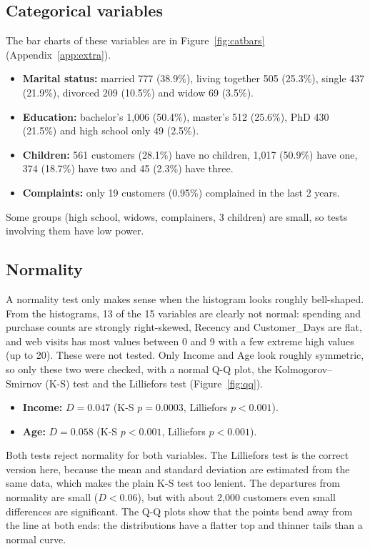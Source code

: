 \documentclass[11pt,a4paper]{article}
\begin{document}
\subsection{Categorical variables}
The bar charts of these variables are in Figure~\ref{fig:catbars} (Appendix~\ref{app:extra}).
\begin{itemize}
	\item \textbf{Marital status:} married 777 (38.9\%), living together 505 (25.3\%), single 437 (21.9\%), divorced 209 (10.5\%) and widow 69 (3.5\%).
	\item \textbf{Education:} bachelor's 1,006 (50.4\%), master's 512 (25.6\%), PhD 430 (21.5\%) and high school only 49 (2.5\%).
	\item \textbf{Children:} 561 customers (28.1\%) have no children, 1,017 (50.9\%) have one, 374 (18.7\%) have two and 45 (2.3\%) have three.
	\item \textbf{Complaints:} only 19 customers (0.95\%) complained in the last 2 years.
\end{itemize}
Some groups (high school, widows, complainers, 3 children) are small, so tests involving them have low power.

\subsection{Normality}
\label{sec:normality}
A normality test only makes sense when the histogram looks roughly bell-shaped. From the histograms, 13 of the 15 variables are clearly not normal: spending and purchase counts are strongly right-skewed, Recency and Customer\_Days are flat, and web visits has most values between 0 and 9 with a few extreme high values (up to 20). These were not tested. Only Income and Age look roughly symmetric, so only these two were checked, with a normal Q-Q plot, the Kolmogorov--Smirnov (K-S) test and the Lilliefors test (Figure~\ref{fig:qq}).

\begin{itemize}
	\item \textbf{Income:} $D = 0.047$ (K-S $p = 0.0003$, Lilliefors $p < 0.001$).
	\item \textbf{Age:} $D = 0.058$ (K-S $p < 0.001$, Lilliefors $p < 0.001$).
\end{itemize}
Both tests reject normality for both variables. The Lilliefors test is the correct version here, because the mean and standard deviation are estimated from the same data, which makes the plain K-S test too lenient. The departures from normality are small ($D < 0.06$), but with about 2,000 customers even small differences are significant. The Q-Q plots show that the points bend away from the line at both ends: the distributions have a flatter top and thinner tails than a normal curve.
\end{document}
